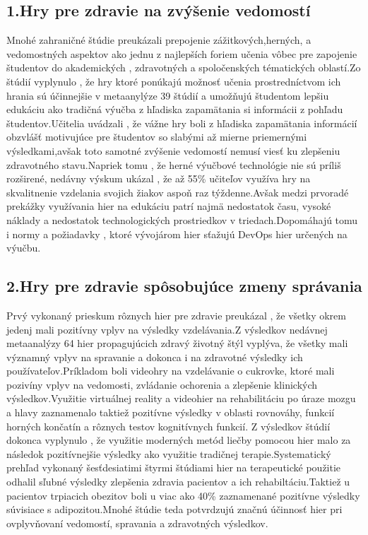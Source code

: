 \documentclass[10pt,twoside,slovak,a4paper]{coursepaper}
\begin{document}
\subsection{1.Hry pre zdravie na zvýšenie vedomostí}
Mnohé zahraničné štúdie preukázali prepojenie zážitkových,herných, a vedomostných aspektov ako jednu z najlepších foriem učenia vôbec pre zapojenie študentov do akademických , zdravotných a spoločenských tématických oblastí.Zo štúdií vyplynulo , že hry ktoré ponúkajú možnosť učenia prostredníctvom ich hrania sú účinnejšie v metaanylýze 39 štúdií a umožňujú študentom lepšiu edukáciu ako tradičná výučba z hľadiska zapamätania si informácii z pohľadu študentov.Učitelia uvádzali , že vážne hry boli z hľadiska zapamätania informácií obzvlášť motivujúce pre študentov so slabými až mierne priemernými výsledkami,avšak toto samotné zvýšenie vedomostí nemusí viesť ku zlepšeniu zdravotného stavu.Napriek tomu , že herné výučbové technológie nie sú príliš rozširené, nedávny výskum ukázal , že až 55\% učiteľov využíva hry na skvalitnenie vzdelania svojich žiakov aspoň raz týždenne.Avšak medzi prvoradé prekážky využívania hier na edukáciu patrí najmä nedostatok času, vysoké náklady a nedostatok technologických prostriedkov v triedach.Dopomáhajú tomu i normy a požiadavky , ktoré vývojárom hier sťažujú DevOps hier určených na výučbu.

\subsection{2.Hry pre zdravie spôsobujúce zmeny správania}
Prvý vykonaný prieskum rôznych hier pre zdravie preukázal , že všetky okrem jedenj mali pozitívny vplyv na výsledky vzdelávania.Z výsledkov nedávnej metaanalýzy 64 hier propagujúcich zdravý životný štýl vyplýva, že všetky mali významný vplyv na spravanie a dokonca i na zdravotné výsledky ich používateľov.Príkladom boli videohry na vzdelávanie o cukrovke, ktoré mali pozivíny vplyv na vedomosti, zvládanie ochorenia a zlepšenie klinických výsledkov.Využitie virtuálnej reality a videohier na rehabilitáciu po úraze mozgu a hlavy zaznamenalo taktiež pozitívne výsledky v oblasti rovnováhy, funkcií horných končatín a rôznych testov kognitívnych funkcií. Z výsledkov štúdií dokonca vyplynulo , že využitie moderných metód liečby pomocou hier malo za následok  pozitívnejšie výsledky ako využitie tradičnej terapie.Systematický prehľad vykonaný šesťdesiatimi štyrmi štúdiami hier na terapeutické použitie odhalil sľubné výsledky zlepšenia zdravia pacientov a ich rehabiltáciu.Taktiež u pacientov trpiacich obezitov boli u viac ako 40\% zaznamenané pozitívne výsledky súvisiace s adipozitou.Mnohé štúdie teda potvrdzujú značnú účinnosť hier pri ovplyvňovaní vedomostí, spravania a zdravotných výsledkov.
\end{document}
